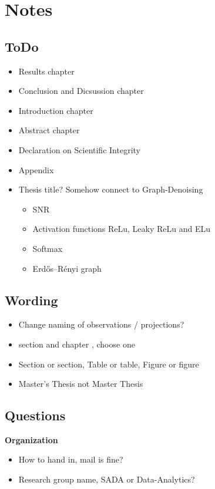 \chapter{Notes}

\section{ToDo}
\begin{itemize}
    \item Results chapter
    \item Conclusion and Dicsussion chapter
    \item Introduction chapter
    \item Abstract chapter
    \item Declaration on Scientific Integrity
    \item Appendix
    \item Thesis title? Somehow connect to Graph-Denoising
    \begin{itemize}
        \item SNR
        \item Activation functions ReLu,  Leaky ReLu and ELu
        \item Softmax
        \item Erdős–Rényi graph
    \end{itemize}
\end{itemize}

\section{Wording}
\begin{itemize}
    \item Change naming of observations / projections?
    \item section and chapter , choose one
    \item Section or section, Table or table, Figure or figure
    \item Master's Thesis not Master Thesis
\end{itemize}

\section{Questions}
\textbf{Organization}
\begin{itemize}
    \item How to hand in, mail is fine?
    \item Research group name, SADA or Data-Analytics?
\end{itemize}


